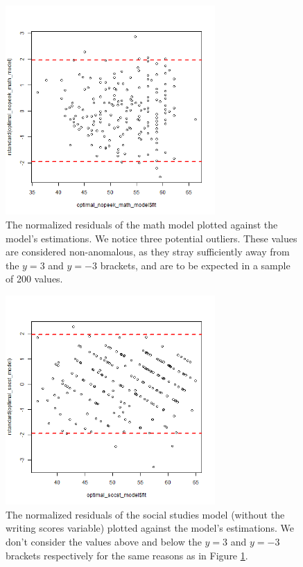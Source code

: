 \documentclass[10pt, a4paper]{article}
\begin{document}
	 \begin{figure}
	 	\includegraphics[width=8cm]{lm_math_nopeeking_residual_plot.png}
	 	\centering
	 	\caption{The normalized residuals of the math model plotted against the model's estimations. We notice three potential outliers. These values are considered non-anomalous, as they stray sufficiently away from the $y=3$ and $y=-3$ brackets, and are to be expected in a sample of 200 values.}
	 	\label{fig::lm_math_nopeeking_plot}
	 \end{figure}
 
	 \begin{figure}
	 	\includegraphics[width=8cm]{lm_socst_residual_plot.png}
	 	\centering
	 	\caption{The normalized residuals of the social studies model (without the writing scores variable) plotted against the model's estimations. We don't consider the values above and below the $y=3$ and $y=-3$ brackets respectively for the same reasons as in Figure \ref{fig::lm_math_nopeeking_plot}.}
	 	\label{fig::lm_sosct_nopeeking_plot}
	 \end{figure}
	
\end{document}
